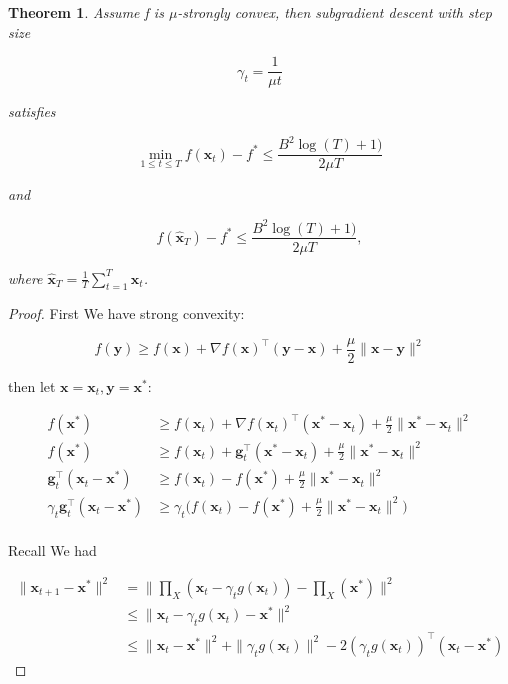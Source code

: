 \documentclass{article}
\newtheorem{theorem}{Theorem}[section]
\begin{document}
		\begin{theorem}
			Assume f is $\mu$-strongly convex, then subgradient descent with step size
			
			\[ \gamma_t = \frac{1}{\mu t} \]
			
			satisfies
			
			\[ \min_{1\le t\le T} f(\mathbf{x}_t) - f^* \le \frac{B^2 \log(T) + 1)}{2\mu T} \]
			
			and
			
			\[ f(\hat{\mathbf{x}}_T) - f^* \le \frac{B^2 \log(T) + 1)}{2\mu T},\]
			
			where $\hat{\mathbf{x}}_T = \frac{1}{T}\sum^T_{t=1} \mathbf{x}_t$.
		\end{theorem}
		
		\begin{proof}
			First We have strong convexity:
			
			\[ f(\mathbf{y}) \ge f(\mathbf{x}) + \nabla f(\mathbf{x})^\top (\mathbf{y-x}) + \frac{\mu}{2} \|\mathbf{x-y}\|^2 \]
			
			then let $\mathbf{x} = \mathbf{x}_t, \mathbf{y} = \mathbf{x}^*$:
			
			\begin{align*}
				f(\mathbf{x}^*) &\ge f(\mathbf{x}_t) + \nabla f(\mathbf{x}_t)^\top (\mathbf{x}^*-\mathbf{x}_t) + \frac{\mu}{2} \|\mathbf{x}^*- \mathbf{x}_t\|^2 \\
				f(\mathbf{x}^*) &\ge f(\mathbf{x}_t) + \mathbf{g}_t^\top (\mathbf{x}^*-\mathbf{x}_t) + \frac{\mu}{2} \|\mathbf{x}^*- \mathbf{x}_t\|^2 \\
				\mathbf{g}_t^\top (\mathbf{x}_t - \mathbf{x}^*)  &\ge f(\mathbf{x}_t) - f(\mathbf{x}^*)  + \frac{\mu}{2} \|\mathbf{x}^*- \mathbf{x}_t\|^2 \\
				\gamma_t\mathbf{g}_t^\top (\mathbf{x}_t - \mathbf{x}^*)  & \ge \gamma_t\bigg(f(\mathbf{x}_t) - f(\mathbf{x}^*)  + \frac{\mu}{2} \|\mathbf{x}^*- \mathbf{x}_t\|^2 \bigg) \\
			\end{align*}
			
			Recall We had
			
			\begin{align*}
				\|\mathbf{x}_{t+1} - \mathbf{x}^* \|^2 &= \| \prod_X(\mathbf{x}_t - \gamma_t g(\mathbf{x}_t)) - \prod_X(\mathbf{x}^*) \|^2 \\
				&\le \| \mathbf{x}_t - \gamma_t g(\mathbf{x}_t) - \mathbf{x}^* \|^2\\
				&\le \| \mathbf{x}_t - \mathbf{x}^* \|^2  + \|\gamma_t g(\mathbf{x}_t) \|^2 - 2(\gamma_t g(\mathbf{x}_t))^\top ( \mathbf{x}_t - \mathbf{x}^*)
			\end{align*}
			

\end{proof}
\end{document}
